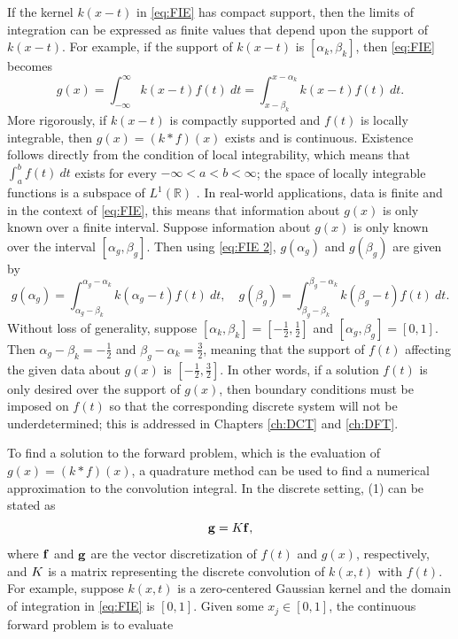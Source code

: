 If the kernel $k(x-t)$ in \eqref{eq:FIE} has compact support, then the limits of integration can be expressed as finite values that depend upon the support of $k(x-t)$. For example, if the support of $k(x-t)$ is $[\alpha_k,\beta_k]$, then \eqref{eq:FIE} becomes
\begin{equation}
\label{eq:FIE 2}
g(x) = \int_{-\infty}^{\infty} k(x-t)f(t) ~dt = \int_{x-\beta_k}^{x-\alpha_k} k(x-t)f(t) ~dt.
\end{equation} 
More rigorously, if $k(x-t)$ is compactly supported and $f(t)$ is locally integrable, then $g(x) = (k*f)(x)$ exists and is continuous. Existence follows directly from the condition of local integrability, which means that $\int_a^b f(t) ~dt$ exists for every $-\infty < a < b < \infty$; the space of locally integrable functions is a subspace of $L^1(\mathbb{R})$ \cite[p.~63]{DebnathMikusinski2005}. In real-world applications, data is finite and in the context of \eqref{eq:FIE}, this means that information about $g(x)$ is only known over a finite interval. Suppose information about $g(x)$ is only known over the interval $[\alpha_g,\beta_g]$. Then using \eqref{eq:FIE 2}, $g(\alpha_g)$ and $g(\beta_g)$ are given by
\[g(\alpha_g) = \int_{\alpha_g-\beta_k}^{\alpha_g-\alpha_k} k(\alpha_g - t)f(t) ~dt, \quad g(\beta_g) = \int_{\beta_g - \beta_k}^{\beta_g - \alpha_k} k(\beta_g-t)f(t) ~dt.\]
Without loss of generality, suppose $[\alpha_k,\beta_k] = [-\frac{1}{2},\frac{1}{2}]$ and $[\alpha_g,\beta_g] = [0,1]$. Then $\alpha_g-\beta_k = -\frac{1}{2}$ and $\beta_g - \alpha_k = \frac{3}{2}$, meaning that the support of $f(t)$ affecting the given data about $g(x)$ is $[-\frac{1}{2},\frac{3}{2}]$. In other words, if a solution $f(t)$ is only desired over the support of $g(x)$, then boundary conditions must be imposed on $f(t)$ so that the corresponding discrete system will not be underdetermined; this is addressed in Chapters \ref{ch:DCT} and \ref{ch:DFT}. \par 
To find a solution to the forward problem, which is the evaluation of $g(x) = (k * f)(x)$, a quadrature method can be used to find a numerical approximation to the convolution integral. In the discrete setting, (1) can be stated as
\begin{equation}
\mathbf{g} = K\mathbf{f},
\label{eq:Dis}
\end{equation}
where $\mathbf{f}$ and $\mathbf{g}$ are the vector discretization of $f(t)$ and $g(x)$, respectively, and $K$ is a matrix representing the discrete convolution of $k(x,t)$ with $f(t)$. For example, suppose $k(x,t)$ is a zero-centered Gaussian kernel and the domain of integration in \eqref{eq:FIE} is $[0,1]$. Given some $x_j \in [0,1]$, the continuous forward problem is to evaluate
